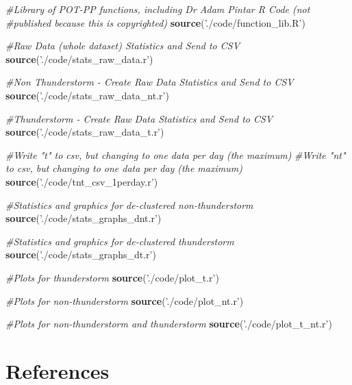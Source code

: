 \documentclass[12pt,oneside]{reedthesis}
\newenvironment{Shaded}{\begin{snugshade}}{\end{snugshade}}
\newcommand{\CommentTok}[1]{\textcolor[rgb]{0.56,0.35,0.01}{\textit{#1}}}
\newcommand{\KeywordTok}[1]{\textcolor[rgb]{0.13,0.29,0.53}{\textbf{#1}}}
\newcommand{\NormalTok}[1]{#1}
\newcommand{\StringTok}[1]{\textcolor[rgb]{0.31,0.60,0.02}{#1}}
\begin{document}
\begin{Shaded}
\begin{Highlighting}[]
\CommentTok{#Library of POT-PP functions, including Dr Adam Pintar R Code (not }
\CommentTok{#published because this is copyrighted)}
\KeywordTok{source}\NormalTok{(}\StringTok{'./code/function_lib.R'}\NormalTok{)}

\CommentTok{#Raw Data (whole dataset) Statistics and Send to CSV }
\KeywordTok{source}\NormalTok{(}\StringTok{'./code/stats_raw_data.r'}\NormalTok{)}

\CommentTok{#Non Thunderstorm - Create Raw Data Statistics and Send to CSV }
\KeywordTok{source}\NormalTok{(}\StringTok{'./code/stats_raw_data_nt.r'}\NormalTok{)}

\CommentTok{#Thunderstorm - Create Raw Data Statistics and Send to CSV}
\KeywordTok{source}\NormalTok{(}\StringTok{'./code/stats_raw_data_t.r'}\NormalTok{)}

\CommentTok{#Write "t" to csv, but changing to one data per day (the maximum)}
\CommentTok{#Write "nt" to csv, but changing to one data per day (the maximum)}
\KeywordTok{source}\NormalTok{(}\StringTok{'./code/tnt_csv_1perday.r'}\NormalTok{)}

\CommentTok{#Statistics and graphics for de-clustered non-thunderstorm}
\KeywordTok{source}\NormalTok{(}\StringTok{'./code/stats_graphs_dnt.r'}\NormalTok{)}

\CommentTok{#Statistics and graphics for de-clustered thunderstorm}
\KeywordTok{source}\NormalTok{(}\StringTok{'./code/stats_graphs_dt.r'}\NormalTok{)}

\CommentTok{#Plots for thunderstorm}
\KeywordTok{source}\NormalTok{(}\StringTok{'./code/plot_t.r'}\NormalTok{)}

\CommentTok{#Plots for non-thunderstorm}
\KeywordTok{source}\NormalTok{(}\StringTok{'./code/plot_nt.r'}\NormalTok{)}

\CommentTok{#Plots for non-thunderstorm and thunderstorm}
\KeywordTok{source}\NormalTok{(}\StringTok{'./code/plot_t_nt.r'}\NormalTok{)}
\end{Highlighting}
\end{Shaded}
\backmatter

\hypertarget{references}{%
\chapter*{References}\label{references}}

\end{document}
